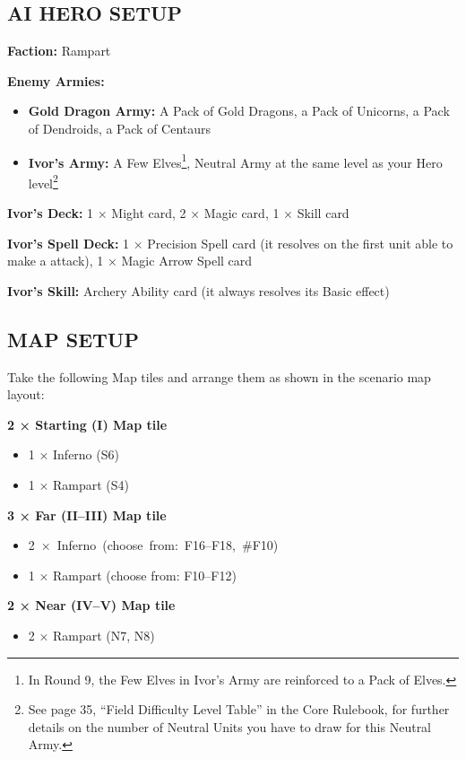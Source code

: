 \begin{multicols*}{2}
\subsection*{\MakeUppercase{AI hero setup}}

\textbf{Faction:} Rampart

\textbf{Enemy Armies:}

\begin{itemize}
  \item \textbf{Gold Dragon Army:} A Pack of Gold Dragons, a Pack of Unicorns, a Pack of Dendroids, a Pack of Centaurs
  \item \textbf{Ivor's Army:} A Few Elves\footnote{In Round 9, the Few Elves in Ivor's Army are reinforced to a Pack of Elves.}, Neutral Army at the same level as your Hero level\footnote{See page 35, ``Field Difficulty Level Table'' in the Core Rulebook, for further details on the number of Neutral Units you have to draw for this Neutral Army.}
\end{itemize}

\textbf{Ivor's Deck:} 1 × Might card, 2 × Magic card, 1 × Skill card

\textbf{Ivor's Spell Deck:} 1 × Precision Spell card (it resolves on the first  unit able to make a  attack), 1 × Magic Arrow Spell card

\textbf{Ivor's Skill:} Archery Ability card (it always resolves its Basic effect)

\subsection*{\MakeUppercase{Map setup}}

Take the following Map tiles and arrange them as shown in the scenario map layout:

\textbf{2 × Starting (I) Map tile}
\begin{itemize}
  \item 1 × Inferno (S6)
  \item 1 × Rampart (S4)
\end{itemize}

\textbf{3 × Far (II--III) Map tile}
\begin{itemize}
  \item \mbox{2 × Inferno (choose from: F16--F18, \#F10)}
  \item 1 × Rampart (choose from: F10--F12)
\end{itemize}

\textbf{2 × Near (IV--V) Map tile}
\begin{itemize}
  \item 2 × Rampart (N7, N8)
\end{itemize}


\end{multicols*}
